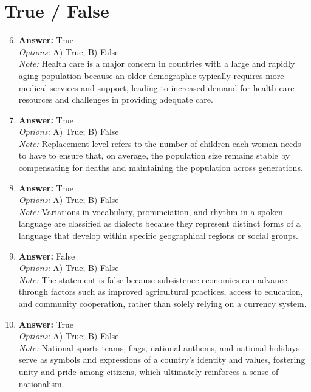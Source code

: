 \documentclass[12pt]{article}
\begin{document}
\section*{True / False}
\begin{enumerate}[label=\arabic*.]
\setcounter{enumi}{5}
\item \textbf{Answer:} True
\\ \textit{Options:} A) True; B) False
\\ \textit{Note:} Health care is a major concern in countries with a large and rapidly aging population because an older demographic typically requires more medical services and support, leading to increased demand for health care resources and challenges in providing adequate care.
\item \textbf{Answer:} True
\\ \textit{Options:} A) True; B) False
\\ \textit{Note:} Replacement level refers to the number of children each woman needs to have to ensure that, on average, the population size remains stable by compensating for deaths and maintaining the population across generations.
\item \textbf{Answer:} True
\\ \textit{Options:} A) True; B) False
\\ \textit{Note:} Variations in vocabulary, pronunciation, and rhythm in a spoken language are classified as dialects because they represent distinct forms of a language that develop within specific geographical regions or social groups.
\item \textbf{Answer:} False
\\ \textit{Options:} A) True; B) False
\\ \textit{Note:} The statement is false because subsistence economies can advance through factors such as improved agricultural practices, access to education, and community cooperation, rather than solely relying on a currency system.
\item \textbf{Answer:} True
\\ \textit{Options:} A) True; B) False
\\ \textit{Note:} National sports teams, flags, national anthems, and national holidays serve as symbols and expressions of a country's identity and values, fostering unity and pride among citizens, which ultimately reinforces a sense of nationalism.
\end{enumerate}
\end{document}
